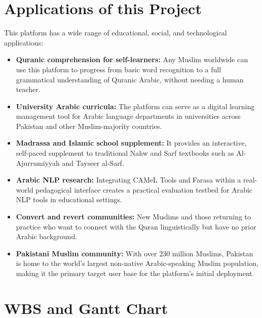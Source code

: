 \documentclass[A4paper,12pt]{article}
\begin{document}
\section{Applications of this Project}

This platform has a wide range of educational, social, and technological applications:

\begin{itemize}[leftmargin=1.5em]
    \item \textbf{Quranic comprehension for self-learners:} Any Muslim worldwide can use this
    platform to progress from basic word recognition to a full grammatical understanding of
    Quranic Arabic, without needing a human teacher.

    \item \textbf{University Arabic curricula:} The platform can serve as a digital learning management
    tool for Arabic language departments in universities across Pakistan and other Muslim-majority
    countries.

    \item \textbf{Madrassa and Islamic school supplement:} It provides an interactive, self-paced
    supplement to traditional Nahw and Sarf textbooks such as Al-Ajurrumiyyah and Tayseer al-Sarf.

    \item \textbf{Arabic NLP research:} Integrating CAMeL Tools and Farasa within a real-world
    pedagogical interface creates a practical evaluation testbed for Arabic NLP tools in
    educational settings.

    \item \textbf{Convert and revert communities:} New Muslims and those returning to practice who
    want to connect with the Quran linguistically but have no prior Arabic background.

    \item \textbf{Pakistani Muslim community:} With over 230 million Muslims, Pakistan is home to the
    world's largest non-native Arabic-speaking Muslim population, making it the primary target
    user base for the platform's initial deployment.
\end{itemize}

\section{WBS and Gantt Chart}
\end{document}
